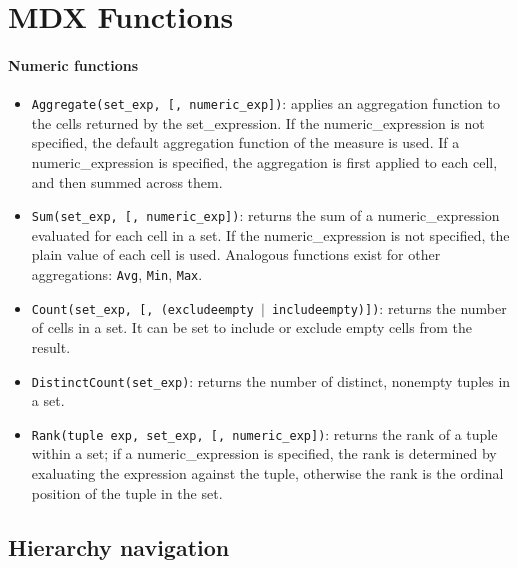 \section{MDX Functions}

\paragraph{Numeric functions}
\begin{itemize}
    \item \texttt{Aggregate(set\_exp, [, numeric\_exp])}: applies an aggregation function to the cells returned by the set\_expression. If the numeric\_expression is not specified, the default aggregation function of the measure is used. If a numeric\_expression is specified, the aggregation is first applied to each cell, and then summed across them.
    \item \texttt{Sum(set\_exp, [, numeric\_exp])}: returns the sum of a numeric\_expression evaluated for each cell in a set. If the numeric\_expression is not specified, the plain value of each cell is used. Analogous functions exist for other aggregations: \texttt{Avg}, \texttt{Min}, \texttt{Max}.
    \item \texttt{Count(set\_exp, [, (excludeempty $|$ includeempty)])}: returns the number of cells in a set. It can be set to include or exclude empty cells from the result.
    \item \texttt{DistinctCount(set\_exp)}: returns the number of distinct, nonempty tuples in a set.
    \item \texttt{Rank(tuple exp, set\_exp, [, numeric\_exp])}: returns the rank of a tuple within a set; if a numeric\_expression is specified, the rank is determined by exaluating the expression against the tuple, otherwise the rank is the ordinal position of the tuple in the set.
\end{itemize}

\subsection{Hierarchy navigation}

